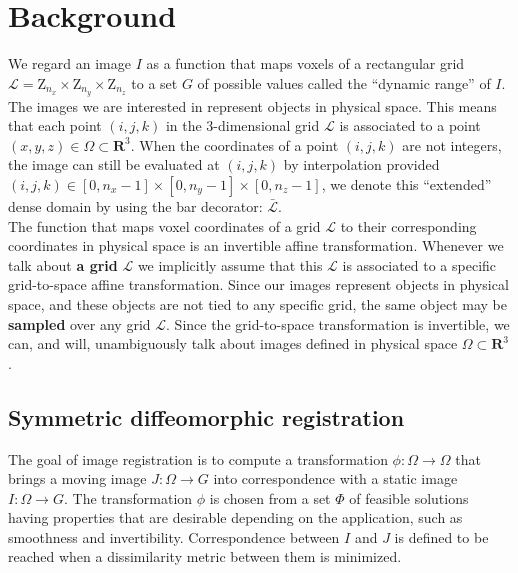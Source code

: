 \section{Background}

We regard an image $I$ as a function that maps voxels of a rectangular grid \hbox{$\mathcal{L} = \mathrm{Z}_{n_{x}} \times \mathrm{Z}_{n_{y}} \times \mathrm{Z}_{n_{z}}$} to a set $G$ of
possible values called the ``dynamic range'' of $I$. The images we are interested in represent objects in physical space. This means that each point $(i,j,k)$ in the
3-dimensional grid $\mathcal{L}$ is associated to a point $(x,y,z) \in \Omega \subset \mathbf{R}^{3}$. When the coordinates of a point
\hbox{$(i,j,k)$} are not integers, the image can still be evaluated at $(i, j, k)$ by interpolation provided
\hbox{$(i,j,k) \in \left[0, n_{x}-1\right] \times \left[0, n_{y}-1\right] \times \left[0, n_{z}-1\right]$}, we denote this ``extended'' dense domain by using the bar decorator:
$\bar{\mathcal{L}}$.\\

The function that maps voxel coordinates of a grid $\mathcal{L}$ to their corresponding coordinates in physical space is an invertible affine transformation. Whenever we talk about
\textbf{a grid} $\mathcal{L}$ we implicitly assume that this $\mathcal{L}$ is associated to a specific grid-to-space affine transformation.
Since our images represent objects in physical space, and these objects are not tied to any specific grid, the same object may be \textbf{sampled} over any grid $\mathcal{L}$. Since
the grid-to-space transformation is invertible, we can, and will, unambiguously talk about images defined in physical space $\Omega \subset \mathbf{R}^{3}$.\\

\subsection{Symmetric diffeomorphic registration}

The goal of image registration is to compute a transformation $\phi: \Omega \rightarrow \Omega$ that brings a moving image $J:\Omega \rightarrow G$ into correspondence
with a static image $I:\Omega \rightarrow G$. The transformation $\phi$ is chosen from a set $\Phi$ of feasible solutions having properties that are desirable depending on the
application, such as smoothness and invertibility. Correspondence between $I$ and $J$ is defined to be reached when a dissimilarity metric between them is minimized.\\


